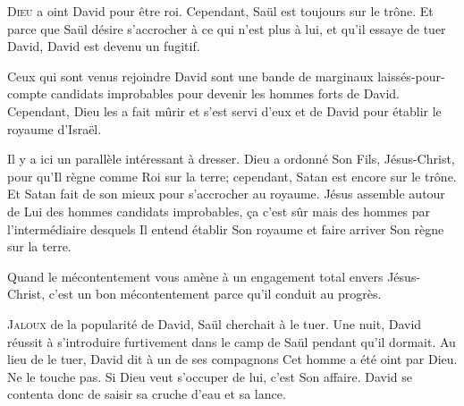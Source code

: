 \lettrine{D}{ieu} a oint David pour être roi.
 Cependant, Saül est toujours sur le trône.
 Et parce que Saül désire s'accrocher à ce qui n'est plus à lui,
 et qu'il essaye de tuer David, David est devenu un fugitif.

Ceux qui sont venus rejoindre David sont une bande de marginaux
 laissés-pour-compte \ocadr candidats improbables pour devenir
 les hommes forts de David.
 Cependant, Dieu les a fait mûrir et s'est servi d'eux
 et de David pour établir le royaume d'Israël.

Il y a ici un parallèle intéressant à dresser.
 Dieu a ordonné Son Fils, Jésus-Christ, pour qu'Il règne comme Roi sur la terre;
 cependant, Satan est encore sur le trône.
 Et Satan fait de son mieux pour s'accrocher au royaume.
 Jésus assemble autour de Lui des hommes
 \ocadr candidats improbables, \c{c}a c'est sûr \fcadr
 mais des hommes par l'intermédiaire desquels Il entend établir Son royaume
 et faire arriver Son règne sur la terre.


Quand le mécontentement vous amène à un engagement total envers Jésus-Christ,
 c'est un bon mécontentement parce qu'il conduit au progrès. 

\dvrule






\lettrine{J}{aloux} de la popularité de David, Saül cherchait à le tuer.
 Une nuit, David réussit à s'introduire furtivement dans le camp de Saül
 pendant qu'il dormait. Au lieu de le tuer, David dit à un de ses compagnons\frcolon
 \Og Cet homme a été oint par Dieu. Ne le touche pas.
 Si Dieu veut s'occuper de lui, c'est Son affaire. \Fg{}
 David se contenta donc de saisir sa cruche d'eau et sa lance.

